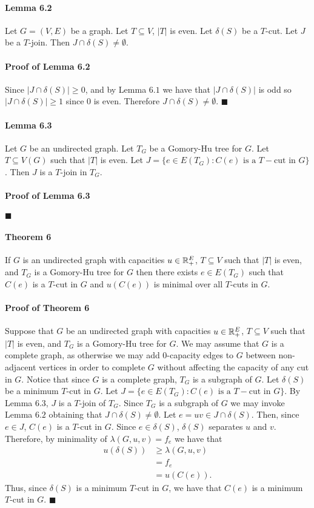\documentclass[letterpaper,12pt,oneside,onecolumn]{article}
\begin{document}
\paragraph{Lemma 6.2}
Let $G=(V,E)$ be a graph. Let $T \subseteq V$, $|T|$ is even. Let $\delta(S)$ be a $T$-cut. Let $J$ be a $T$-join. Then $J \cap \delta(S) \neq \emptyset$.
\paragraph{Proof of Lemma 6.2}
Since $|J \cap \delta(S)| \geq 0$, and by Lemma $6.1$ we have that $|J \cap \delta(S)|$ is odd so $|J \cap \delta(S)| \geq 1$ since $0$ is even. Therefore $J \cap \delta(S) \neq \emptyset$. $\blacksquare$
\paragraph{Lemma 6.3}
Let $G$ be an undirected graph. Let $T_G$ be a Gomory-Hu tree for $G$. Let $T \subseteq V(G)$ such that $|T|$ is even. Let $J = \{e \in E(T_G) : C(e) \text{ is a } T-\text{cut in } G\}$. Then $J$ is a $T$-join in $T_G$.
\paragraph{Proof of Lemma 6.3}
$\blacksquare$
\paragraph{Theorem 6}
If $G$ is an undirected graph with capacities $u \in \mathbb{R}_+^E$, $T\subseteq V$ such that $|T|$ is even, and $T_G$ is a Gomory-Hu tree for $G$ then there exists $e\in E(T_G)$ such that $C(e)$ is a $T$-cut in $G$ and $u(C(e))$ is minimal over all $T$-cuts in $G$.
\paragraph{Proof of Theorem 6}
Suppose that $G$ be an undirected graph with capacities $u \in \mathbb{R}_+^E$, $T\subseteq V$ such that $|T|$ is even, and $T_G$ is a Gomory-Hu tree for $G$. We may assume that $G$ is a complete graph, as otherwise we may add $0$-capacity edges to $G$ between non-adjacent vertices in order to complete $G$ without affecting the capacity of any cut in $G$. Notice that since $G$ is a complete graph, $T_G$ is a subgraph of $G$. Let $\delta(S)$ be a minimum $T$-cut in $G$. Let $J  = \{e \in E(T_G) : C(e) \text{ is a } T-\text{cut in } G\}$. By Lemma $6.3$, $J$ is a $T$-join of $T_G$. Since $T_G$ is a subgraph of $G$ we may invoke Lemma $6.2$ obtaining that $J \cap \delta(S) \neq \emptyset$. Let $e=uv \in J \cap \delta(S)$. Then, since $e \in J$, $C(e)$ is a $T$-cut in $G$. Since $e \in \delta(S)$, $\delta(S)$ separates $u$ and $v$. Therefore, by minimality of $\lambda(G, u,v) = f_e$ we have that
\begin{align*}
u(\delta(S)) &\geq \lambda(G,u,v) \\
&= f_e \\
&= u(C(e)).
\end{align*}
Thus, since $\delta(S)$ is a minimum $T$-cut in $G$, we have that $C(e)$ is a minimum $T$-cut in $G$. $\blacksquare$
\end{document}
